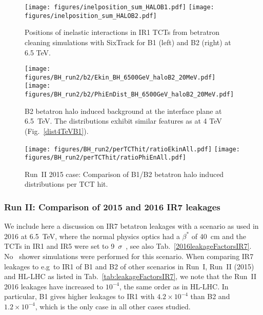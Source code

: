 \begin{figure}[!htb]
\begin{center}
\texttt{[image: figures/inelposition\_sum\_HALOB1.pdf]}
\texttt{[image: figures/inelposition\_sum\_HALOB2.pdf]}
\end{center}
 \caption{Positions of inelastic interactions in IR1 TCTs from betratron cleaning simulations with SixTrack for B1 (left) and B2 (right) at 6.5 TeV.
  \label{inel6.5}}
\end{figure}


\begin{figure}%
\centering
\texttt{[image: figures/BH\_run2/b2/Ekin\_BH\_6500GeV\_haloB2\_20MeV.pdf]}
\texttt{[image: figures/BH\_run2/b2/PhiEnDist\_BH\_6500GeV\_haloB2\_20MeV.pdf]}
 \caption{B2 betatron halo induced background at the interface plane at 6.5~TeV. The distributions exhibit similar features as at 4 TeV (Fig.~\ref{dist4TeVB1}).
  \label{dist6500GeVB2}}
\end{figure}


\begin{figure}%
\centering
  \texttt{[image: figures/BH\_run2/perTCThit/ratioEkinAll.pdf]}
  \texttt{[image: figures/BH\_run2/perTCThit/ratioPhiEnAll.pdf]}
 \caption{Run~II 2015 case: Comparison of B1/B2 betatron halo induced distributions per TCT hit.
  \label{compBHB1B2run2}}
\end{figure}

\subsubsection{Run II: Comparison of 2015 and 2016 IR7 leakages}

We include here a discussion on IR7 betatron leakages with a scenario as used in 2016 at 6.5~TeV, where the normal physics optics had a $\beta^*$ of 40~cm and the TCTs in IR1 and IR5 were set to 9~$\sigma$~\cite{bruceEvian2015}, see also Tab.~\ref{2016leakageFactorsIR7}. No \fluka~shower simulations were performed for this scenario. When comparing IR7 leakages to e.g~to IR1 of B1 and B2 of other scenarios in Run~I, Run~II (2015) and HL-LHC as listed in Tab.~\ref{tab:leakageFactorsIR7}, we note that the Run~II 2016 leakages have increased to $10^{-4}$, the same order as in HL-LHC. In particular, B1 gives higher leakages to IR1 with $4.2 \times 10^{-4}$ than B2 and $1.2 \times 10^{-4}$, which is the only case in all other cases studied.



